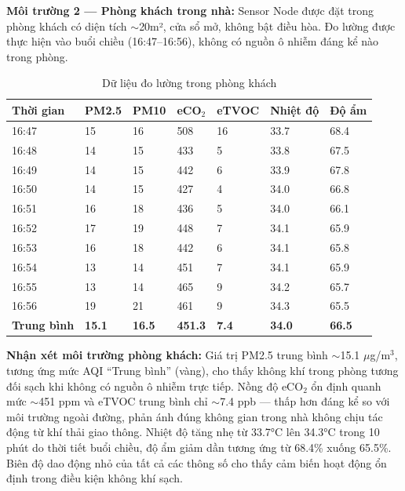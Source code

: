 \documentclass[../DoAn.tex]{subfiles}
\begin{document}
\textbf{Môi trường 2 — Phòng khách trong nhà:} Sensor Node được đặt trong phòng khách có diện tích $\sim$20m², cửa sổ mở, không bật điều hòa. Đo lường được thực hiện vào buổi chiều (16:47--16:56), không có nguồn ô nhiễm đáng kể nào trong phòng.

\begin{table}[H]
\centering
\caption{Dữ liệu đo lường trong phòng khách}
\label{table:thuc_nghiem_trong_nha}
\small
\begin{tabularx}{\textwidth}{|X|X|X|X|X|X|X|}
\hline
\textbf{Thời gian} & \textbf{PM2.5} & \textbf{PM10} & \textbf{eCO$_2$} & \textbf{eTVOC} & \textbf{Nhiệt độ} & \textbf{Độ ẩm} \\
\hline
16:47 & 15 & 16 & 508 & 16 & 33.7 & 68.4 \\
\hline
16:48 & 14 & 15 & 433 & 5 & 33.8 & 67.5 \\
\hline
16:49 & 14 & 15 & 442 & 6 & 33.9 & 67.8 \\
\hline
16:50 & 14 & 15 & 427 & 4 & 34.0 & 66.8 \\
\hline
16:51 & 16 & 18 & 436 & 5 & 34.0 & 66.1 \\
\hline
16:52 & 17 & 19 & 448 & 7 & 34.1 & 65.9 \\
\hline
16:53 & 16 & 18 & 442 & 6 & 34.1 & 65.8 \\
\hline
16:54 & 13 & 14 & 451 & 7 & 34.1 & 65.9 \\
\hline
16:55 & 13 & 14 & 465 & 9 & 34.2 & 65.7 \\
\hline
16:56 & 19 & 21 & 461 & 9 & 34.3 & 65.5 \\
\hline
\textbf{Trung bình} & \textbf{15.1} & \textbf{16.5} & \textbf{451.3} & \textbf{7.4} & \textbf{34.0} & \textbf{66.5} \\
\hline
\end{tabularx}
\end{table}

\textbf{Nhận xét môi trường phòng khách:} Giá trị PM2.5 trung bình $\sim$15.1 $\mu$g/m$^3$, tương ứng mức AQI ``Trung bình'' (vàng), cho thấy không khí trong phòng tương đối sạch khi không có nguồn ô nhiễm trực tiếp. Nồng độ eCO$_2$ ổn định quanh mức $\sim$451 ppm và eTVOC trung bình chỉ $\sim$7.4 ppb — thấp hơn đáng kể so với môi trường ngoài đường, phản ánh đúng không gian trong nhà không chịu tác động từ khí thải giao thông. Nhiệt độ tăng nhẹ từ 33.7°C lên 34.3°C trong 10 phút do thời tiết buổi chiều, độ ẩm giảm dần tương ứng từ 68.4\% xuống 65.5\%. Biên độ dao động nhỏ của tất cả các thông số cho thấy cảm biến hoạt động ổn định trong điều kiện không khí sạch.
\end{document}
